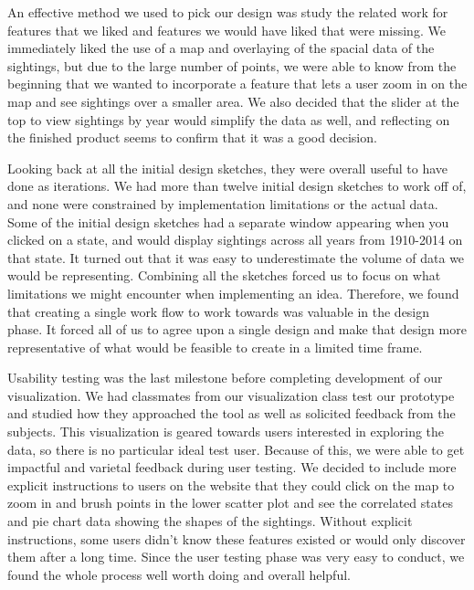 \documentclass[journal]{vgtc}                %
\begin{document}
An effective method we used to pick our design was study the related work for features that we liked and features we would have liked that were missing. We immediately liked the use of a map and overlaying of the spacial data of the sightings, but due to the large number of points, we were able to know from the beginning that we wanted to incorporate a feature that lets a user zoom in on the map and see sightings over a smaller area. We also decided that the slider at the top to view sightings by year would simplify the data as well, and reflecting on the finished product seems to confirm that it was a good decision. 

Looking back at all the initial design sketches, they were overall useful to have done as iterations. We had more than twelve initial design sketches to work off of, and none were constrained by implementation limitations or the actual data. Some of the initial design sketches had a separate window appearing when you clicked on a state, and would display sightings across all years from 1910-2014 on that state. It turned out that it was easy to underestimate the volume of data we would be representing. Combining all the sketches forced us to focus on what limitations we might encounter when implementing an idea. Therefore, we found that creating a single work flow to work towards was valuable in the design phase. It forced all of us to agree upon a single design and make that design more representative of what would be feasible to create in a limited time frame. 

Usability testing was the last milestone before completing development of our visualization. We had classmates from our visualization class test our prototype and studied how they approached the tool as well as solicited feedback from the subjects. This visualization is geared towards users interested in exploring the data, so there is no particular ideal test user. Because of this, we were able to get impactful and varietal feedback during user testing. We decided to include more explicit instructions to users on the website that they could click on the map to zoom in and brush points in the lower scatter plot and see the correlated states and pie chart data showing the shapes of the sightings. Without explicit instructions, some users didn't know these features existed or would only discover them after a long time. Since the user testing phase was very easy to conduct, we found the whole process well worth doing and overall helpful.
\end{document}
